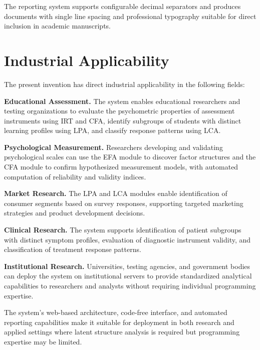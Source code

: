\documentclass[12pt,a4paper]{article}
\begin{document}
The reporting system supports configurable decimal separators and produces documents with single line spacing and professional typography suitable for direct inclusion in academic manuscripts.

\section{Industrial Applicability}

The present invention has direct industrial applicability in the following fields:

\textbf{Educational Assessment.} The system enables educational researchers and testing organizations to evaluate the psychometric properties of assessment instruments using IRT and CFA, identify subgroups of students with distinct learning profiles using LPA, and classify response patterns using LCA.

\textbf{Psychological Measurement.} Researchers developing and validating psychological scales can use the EFA module to discover factor structures and the CFA module to confirm hypothesized measurement models, with automated computation of reliability and validity indices.

\textbf{Market Research.} The LPA and LCA modules enable identification of consumer segments based on survey responses, supporting targeted marketing strategies and product development decisions.

\textbf{Clinical Research.} The system supports identification of patient subgroups with distinct symptom profiles, evaluation of diagnostic instrument validity, and classification of treatment response patterns.

\textbf{Institutional Research.} Universities, testing agencies, and government bodies can deploy the system on institutional servers to provide standardized analytical capabilities to researchers and analysts without requiring individual programming expertise.

The system's web-based architecture, code-free interface, and automated reporting capabilities make it suitable for deployment in both research and applied settings where latent structure analysis is required but programming expertise may be limited.
\end{document}
